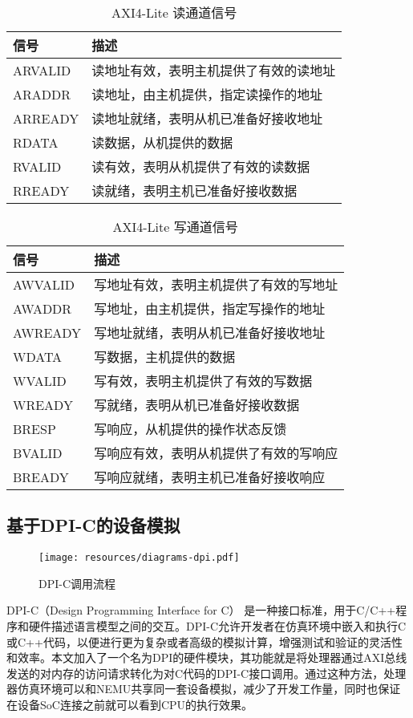 \begin{table}[h]
\centering
\begin{tabular}{|l | p{10cm}|}
\hline
\textbf{信号} & \textbf{描述} \\
\hline
ARVALID & 读地址有效，表明主机提供了有效的读地址 \\
\hline
ARADDR  & 读地址，由主机提供，指定读操作的地址 \\
\hline
ARREADY & 读地址就绪，表明从机已准备好接收地址 \\
\hline
RDATA   & 读数据，从机提供的数据 \\
\hline
RVALID  & 读有效，表明从机提供了有效的读数据 \\
\hline
RREADY  & 读就绪，表明主机已准备好接收数据 \\
\hline
\end{tabular}
\caption{AXI4-Lite 读通道信号} \label{tab:axi4-read}
\end{table}

\begin{table}[h]
\centering
\begin{tabular}{|l | p{10cm}|}
\hline
\textbf{信号} & \textbf{描述} \\
\hline
AWVALID & 写地址有效，表明主机提供了有效的写地址 \\
\hline
AWADDR  & 写地址，由主机提供，指定写操作的地址 \\
\hline
AWREADY & 写地址就绪，表明从机已准备好接收地址 \\
\hline
WDATA   & 写数据，主机提供的数据 \\
\hline
WVALID  & 写有效，表明主机提供了有效的写数据 \\
\hline
WREADY  & 写就绪，表明从机已准备好接收数据 \\
\hline
BRESP   & 写响应，从机提供的操作状态反馈 \\
\hline
BVALID  & 写响应有效，表明从机提供了有效的写响应 \\
\hline
BREADY  & 写响应就绪，表明主机已准备好接收响应 \\
\hline
\end{tabular}
\caption{AXI4-Lite 写通道信号}\label{tab:axi4-write}
\end{table}

\subsection{基于DPI-C的设备模拟}

\begin{figure}
    \centering
    \texttt{[image: resources/diagrams-dpi.pdf]}
    \caption{DPI-C调用流程}
    \label{fig:my_label}
\end{figure}
DPI-C（Design Programming Interface for C）\cite{IEEEStandardSystemVerilog2005} 是一种接口标准，用于C/C++程序和硬件描述语言模型之间的交互。DPI-C允许开发者在仿真环境中嵌入和执行C或C++代码，以便进行更为复杂或者高级的模拟计算，增强测试和验证的灵活性和效率。本文加入了一个名为DPI的硬件模块，其功能就是将处理器通过AXI总线发送的对内存的访问请求转化为对C代码的DPI-C接口调用。通过这种方法，处理器仿真环境可以和NEMU共享同一套设备模拟，减少了开发工作量，同时也保证在设备SoC连接之前就可以看到CPU的执行效果。

